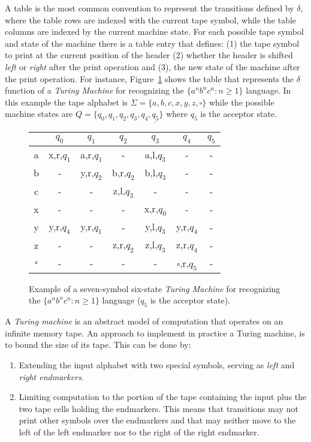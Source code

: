\documentclass[letterpaper]{article} %
\begin{document}
A table is the most common convention to represent the transitions defined by $\delta$, where the table rows are indexed with the current tape symbol, while the table columns are indexed by the current machine state. For each possible tape symbol and state of the machine there is a table entry that defines: (1) the tape symbol to print at the current position of the header (2) whether the header is shifted {\em left} or {\em right} after the print operation and (3), the new state of the machine after the print operation. For instance, Figure~\ref{tab:tm-anbncn} shows the table that represents the $\delta$ function of a {\em Turing Machine} for recognizing the $\{a^nb^nc^n : n \geq 1 \}$ language. In this example the tape alphabet is $\Sigma=\{a,b,c,x,y,z,\square\}$ while the possible machine states are $Q=\{q_0,q_1,q_2,q_3,q_4,\underline{q_5}\}$ where \underline{$q_5$} is the acceptor state.

\begin{figure}
\begin{center}
    \begin{tabular}{| c | c | c | c | c | c | c |}
    \hline
      & $q_0$ & $q_1$ & $q_2$ & $q_3$ & $q_4$ & \underline{$q_5$} \\ \hline
    a & x,r,$q_1$ & a,r,$q_1$ & - &  a,l,$q_3$ & - & - \\ \hline
    b & - & y,r,$q_2$ & b,r,$q_2$ & b,l,$q_3$ & - & - \\ \hline
    c & - & - & z,l,$q_3$ & - & - & - \\ \hline
    x & - & - & - & x,r,$q_0$ & - & - \\ \hline
    y & y,r,$q_4$ & y,r,$q_1$ & - & y,l,$q_3$ & y,r,$q_4$ & - \\ \hline
    z & - & - & z,r,$q_2$ & z,l,$q_3$ & z,r,$q_4$ & - \\\hline
    $\square$ & - & - & - & - & $\square$,r,$q_5$  & - \\                
    \hline
    \end{tabular}
\end{center}
  \caption{\small Example of a seven-symbol six-state {\em Turing Machine} for recognizing the $\{a^nb^nc^n : n \geq 1 \}$ language (\underline{$q_5$} is the acceptor state).}
  \label{tab:tm-anbncn}
\end{figure}

A {\em Turing machine} is an abstract model of computation that operates on an infinite memory tape. An approach to implement in practice a Turing machine, is to bound the size of its tape. This can be done by: 
\begin{enumerate}
\item Extending the input alphabet with two special symbols, serving as {\em left} and {\em right endmarkers}.
\item Limiting computation to the portion of the tape containing the input plus the two tape cells holding the endmarkers. This means that transitions may not print other symbols over the endmarkers and that may neither move to the left of the left endmarker nor to the right of the right endmarker.
\end{enumerate}
\end{document}
